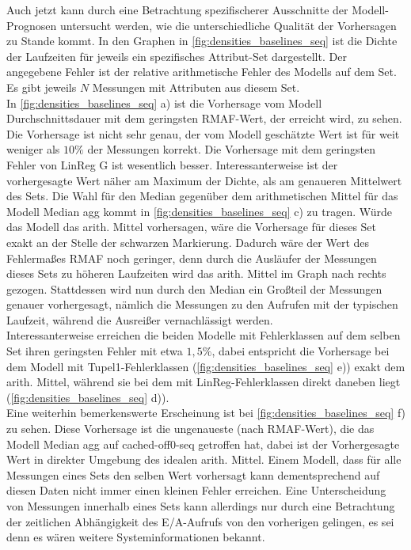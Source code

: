 \documentclass[
	12pt,
	a4paper,
	BCOR10mm,
	DIV14,
	listof=totoc,
	bibliography=totoc,
	headsepline
]{scrreprt}
\begin{document}
Auch jetzt kann durch eine Betrachtung spezifischerer Ausschnitte der Modell-Prognosen untersucht werden, wie die unterschiedliche Qualität der Vorhersagen zu Stande kommt. In den Graphen in \ref{fig:densities_baselines_seq} ist die Dichte der Laufzeiten für jeweils ein spezifisches Attribut-Set dargestellt. Der angegebene Fehler ist der relative arithmetische Fehler des Modells auf dem Set. Es gibt jeweils $N$ Messungen mit Attributen aus diesem Set.\\
In \ref{fig:densities_baselines_seq} a) ist die Vorhersage vom Modell \glqq Durchschnittsdauer\grqq{} mit dem geringsten RMAF-Wert, der erreicht wird, zu sehen. Die Vorhersage ist nicht sehr genau, der vom Modell geschätzte Wert ist für weit weniger als $10\%$ der Messungen korrekt. Die Vorhersage mit dem geringsten Fehler von \glqq LinReg G\grqq{} ist wesentlich besser. Interessanterweise ist der vorhergesagte Wert näher am Maximum der Dichte,
als am genaueren Mittelwert des Sets.
Die Wahl für den Median gegenüber dem arithmetischen Mittel für das Modell \glqq Median agg\grqq{} kommt in \ref{fig:densities_baselines_seq} c) zu tragen. Würde das Modell das arith. Mittel vorhersagen, wäre die Vorhersage für dieses Set exakt an der Stelle der schwarzen Markierung. Dadurch wäre der Wert des Fehlermaßes  RMAF noch geringer, denn durch die Ausläufer der Messungen dieses Sets zu höheren Laufzeiten wird das arith. Mittel im Graph nach rechts gezogen. Stattdessen wird nun durch den Median ein Großteil der Messungen genauer vorhergesagt, nämlich die Messungen zu den Aufrufen mit der typischen Laufzeit, während die Ausreißer vernachlässigt werden.\\
Interessanterweise erreichen die beiden Modelle mit Fehlerklassen auf dem selben Set ihren geringsten Fehler mit etwa $1,5\%$, dabei entspricht die Vorhersage bei dem Modell mit Tupel1-Fehlerklassen (\ref{fig:densities_baselines_seq} e)) exakt dem arith. Mittel, während sie bei dem mit LinReg-Fehlerklassen direkt daneben liegt (\ref{fig:densities_baselines_seq} d)). \\
Eine weiterhin bemerkenswerte Erscheinung ist bei \ref{fig:densities_baselines_seq} f) zu sehen. Diese Vorhersage ist die ungenaueste (nach RMAF-Wert), die das Modell \glqq Median agg\grqq{} auf cached-off0-seq getroffen hat, dabei ist der Vorhergesagte Wert in direkter Umgebung des \glqq idealen\grqq{} arith. Mittel. Einem Modell, dass für alle Messungen eines Sets den selben Wert vorhersagt kann dementsprechend auf diesen Daten nicht immer einen kleinen Fehler erreichen. Eine Unterscheidung von Messungen innerhalb eines Sets kann allerdings nur durch eine Betrachtung der zeitlichen Abhängigkeit des E/A-Aufrufs von den vorherigen gelingen, es sei denn es wären weitere Systeminformationen bekannt.
 
\end{document}
